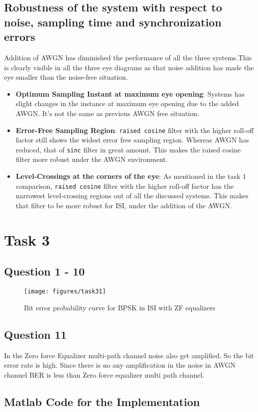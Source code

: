 \documentclass[a4paper,11pt]{article}%
\begin{document}
\subsection{Robustness of the system with respect to noise, sampling time and synchronization errors}

Addition of AWGN has diminished the performance of all the three systems.This is clearly visible in all the three eye diagrams as that noise addition has made the eye smaller than the noise-free situation.

\begin{itemize}
	\item \textbf{Optimum Sampling Instant at maximum eye opening}: Systems has slight changes in the instance at maximum eye opening due to the added AWGN. 
	It's not the same as previous AWGN free situation.
	\item \textbf{Error-Free Sampling Region}: {\tt raised cosine} filter with  the higher roll-off factor still shows the widest error free sampling region. Whereas AWGN has reduced, that of {\tt sinc} filter in great amount. This makes the raised cosine filter more robust under the AWGN environment.
	\item \textbf{Level-Crossings at the corners of the eye}: As mentioned in the task 1 comparison, {\tt raised cosine} filter with  the higher roll-off factor has the narrowest level-crossing regions out of all the discussed systems. This makes that filter to be more robust for ISI, under the addition of the AWGN.
	
\end{itemize}

\section{Task 3}
\subsection{Question 1 - 10}
\begin{figure}[H]
	\centering
	\texttt{[image: figures/task31]}
	\caption{Bit error probability curve for BPSK in ISI with ZF equalizers}
\end{figure}

\subsection{Question 11}
In the Zero force Equalizer multi-path channel noise also get amplified. So the bit error rate is high. Since there is no any amplification in the noise in AWGN channel BER is less than Zero force equalizer multi path channel.


\begin{appendices}
	\section{Matlab Code for the Implementation}
	
\end{appendices}

\end{document}
